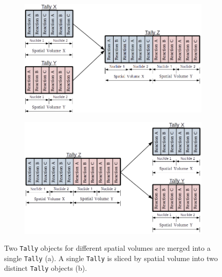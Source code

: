 \begin{figure}
\begin{subfigure}{\textwidth}
  \centering
  \includegraphics[width=\linewidth]{figures/workflow/openmc/tally-merge}
  \caption{}
\end{subfigure}
\begin{subfigure}{\textwidth}
  \centering
  \includegraphics[width=\linewidth]{figures/workflow/openmc/tally-slice}
  \caption{}
\end{subfigure}
\caption[Tally merging and slicing operations]{Two \texttt{Tally} objects for different spatial volumes are merged into a single \texttt{Tally} (a). A single \texttt{Tally} is sliced by spatial volume into two distinct \texttt{Tally} objects (b).}
\label{fig:tally-merge-slice}
\end{figure}



